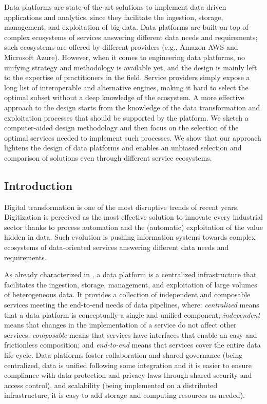 


Data platforms are state-of-the-art solutions to implement data-driven applications and analytics, since they facilitate the ingestion, storage, management, and exploitation of big data. Data platforms are built on top of complex ecosystems of services answering different data needs and requirements; such ecosystems are offered by different providers (e.g., Amazon AWS and Microsoft Azure). However, when it comes to engineering data platforms, no unifying strategy and methodology is available yet, and the design is mainly left to the expertise of practitioners in the field. Service providers simply expose a long list of interoperable and alternative engines, making it hard to select the optimal subset without a deep knowledge of the ecosystem. A more effective approach to the design starts from the knowledge of the data transformation and exploitation processes that should be supported by the platform. We sketch a computer-aided design methodology and then focus on the selection of the optimal services needed to implement such processes. We show that our approach lightens the design of data platforms and enables an unbiased selection and comparison of solutions even through different service ecosystems.

\subsection{Introduction}

Digital transformation is one of the most disruptive trends of recent years. Digitization is perceived as the most effective solution to innovate every industrial sector thanks to process automation and the (automatic) exploitation of the value hidden in data. Such evolution is pushing information systems towards complex ecosystems of data-oriented services answering different data needs and requirements.

{\color{red}As already characterized in , }a data platform is a centralized infrastructure that facilitates the ingestion, storage, management, and exploitation of large volumes of heterogeneous data. It provides a collection of independent and composable services meeting the end-to-end needs of data pipelines, where: \textit{centralized} means that a data platform is conceptually a single and unified component; \textit{independent} means that changes in the implementation of a service do not affect other services; \textit{composable} means that services have interfaces that enable an easy and frictionless composition; and \textit{end-to-end} means that services cover the entire data life cycle. Data platforms foster collaboration and shared governance (being centralized, data is unified following some integration and it is easier to ensure compliance with data protection and privacy laws through shared security and access control), and scalability (being implemented on a distributed infrastructure, it is easy to add storage and computing resources as needed).

